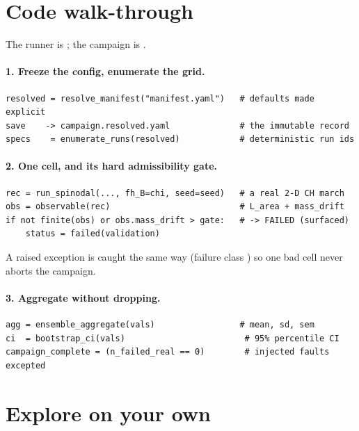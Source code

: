 \section{Code walk-through}

The runner is ; the campaign is .

\paragraph{1. Freeze the config, enumerate the grid.}
\begin{lstlisting}
resolved = resolve_manifest("manifest.yaml")   # defaults made explicit
save    -> campaign.resolved.yaml              # the immutable record
specs    = enumerate_runs(resolved)            # deterministic run ids
\end{lstlisting}

\paragraph{2. One cell, and its hard admissibility gate.}
\begin{lstlisting}
rec = run_spinodal(..., fh_B=chi, seed=seed)   # a real 2-D CH march
obs = observable(rec)                          # L_area + mass_drift
if not finite(obs) or obs.mass_drift > gate:   # -> FAILED (surfaced)
    status = failed(validation)
\end{lstlisting}
A raised exception is caught the same way (failure class )
so one bad cell never aborts the campaign.

\paragraph{3. Aggregate without dropping.}
\begin{lstlisting}
agg = ensemble_aggregate(vals)                 # mean, sd, sem
ci  = bootstrap_ci(vals)                        # 95% percentile CI
campaign_complete = (n_failed_real == 0)        # injected faults excepted
\end{lstlisting}

\section{Explore on your own}


